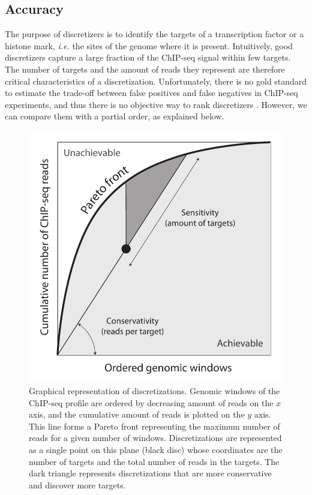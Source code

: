 \documentclass{bioinfo}
\begin{document}
\subsection{Accuracy}
The purpose of discretizers is to identify the targets of a
transcription factor or a histone mark, \textit{i.e.} the sites of
the genome where it is present.
Intuitively, good discretizers capture a large fraction of the
ChIP-seq signal within few targets. The number of targets
and the amount of reads they represent are therefore critical
characteristics of a discretization. Unfortunately, there is no gold
standard to estimate the trade-off between false positives and false
negatives in ChIP-seq experiments, and thus there is no objective way
to rank discretizers \citep{pmid21059603}. However, we can compare
them with a partial order, as explained below.

\begin{figure}[!tpb]
\centerline{\includegraphics[scale=0.5]{pareto_front_explanation.pdf}}
\caption{
  Graphical representation of discretizations. Genomic
  windows of the ChIP-seq profile are ordered by decreasing amount of
  reads on the $x$ axis, and the cumulative amount of reads is plotted
  on the $y$ axis. This line forms a Pareto front representing the
  maximum number of reads for a given number of windows. Discretizations
  are represented as a single point on this plane (black disc) whose
  coordinates are the number of targets and the total number of reads
  in the targets. The dark triangle represents discretizations that
  are more conservative and discover more targets.
}
\label{fig:expl}
\end{figure}
\end{document}
